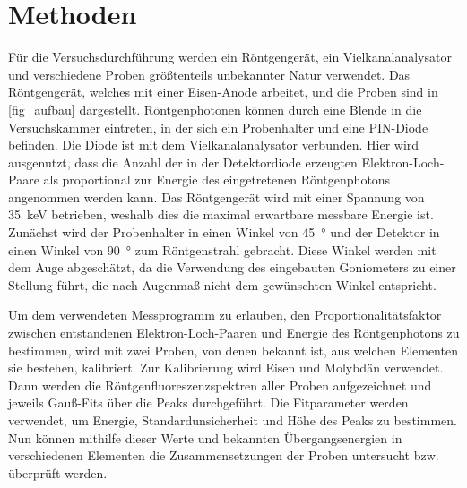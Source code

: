 \documentclass[
	a4paper,
	12pt,
	pagesize,
	ngerman
]{scrartcl}
\begin{document}
	
	
	\section{Methoden}
	Für die Versuchsdurchführung werden ein Röntgengerät, ein Vielkanalanalysator und verschiedene Proben größtenteils unbekannter Natur verwendet. %
	Das Röntgengerät, welches mit einer Eisen-Anode arbeitet, und die Proben sind in \cref{fig_aufbau} dargestellt.
	Röntgenphotonen können durch eine Blende in die Versuchskammer eintreten, in der sich ein Probenhalter und eine PIN-Diode befinden.
	Die Diode ist mit dem Vielkanalanalysator verbunden.
	Hier wird ausgenutzt, dass die Anzahl der in der Detektordiode erzeugten Elektron-Loch-Paare als proportional zur Energie des eingetretenen Röntgenphotons angenommen werden kann. %
	Das Röntgengerät wird mit einer Spannung von \SI{35}{\kilo \electronvolt} betrieben, weshalb dies die maximal erwartbare messbare Energie ist.
	Zunächst wird der Probenhalter in einen Winkel von \SI{45}{\degree} und der Detektor in einen Winkel von \SI{90}{\degree} zum Röntgenstrahl gebracht.
	Diese Winkel werden mit dem Auge abgeschätzt, da die Verwendung des eingebauten Goniometers zu einer Stellung führt, die nach Augenmaß nicht dem gewünschten Winkel entspricht.
	
	Um dem verwendeten Messprogramm zu erlauben, den Proportionalitätsfaktor zwischen entstandenen Elektron-Loch-Paaren und Energie des Röntgenphotons zu bestimmen, wird mit zwei Proben, von denen bekannt ist, aus welchen Elementen sie bestehen, kalibriert.
	Zur Kalibrierung wird Eisen und Molybdän verwendet.
	Dann werden die Röntgenfluoreszenzspektren aller Proben aufgezeichnet und jeweils Gauß-Fits über die Peaks durchgeführt.
	Die Fitparameter werden verwendet, um Energie, Standardunsicherheit und Höhe des Peaks zu bestimmen.
	Nun können mithilfe dieser Werte und bekannten Übergangsenergien in verschiedenen Elementen die Zusammensetzungen der Proben untersucht bzw. überprüft werden.
	
	
\end{document}
